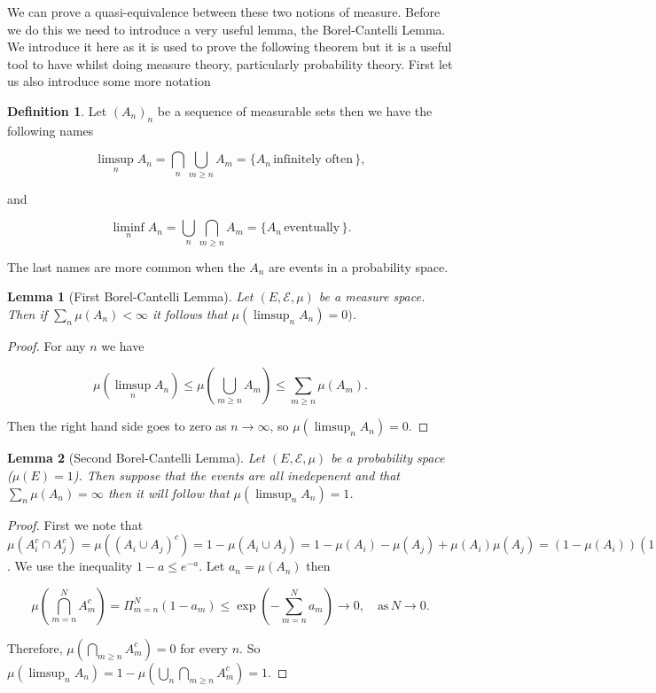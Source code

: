 \documentclass[
]{book}
\newtheorem{lemma}{Lemma}[chapter]
\theoremstyle{definition}
\newtheorem{definition}{Definition}[chapter]
\theoremstyle{definition}
\theoremstyle{definition}
\theoremstyle{definition}
\theoremstyle{remark}
\begin{document}
We can prove a quasi-equivalence between these two notions of measure. Before we do this we need to introduce a very useful lemma, the Borel-Cantelli Lemma. We introduce it here as it is used to prove the following theorem but it is a useful tool to have whilst doing measure theory, particularly probability theory. First let us also introduce some more notation

\begin{definition}
Let \((A_n)_n\) be a sequence of measurable sets then we have the following names

\[ \limsup_n A_n = \bigcap_n \bigcup_{m \geq n} A_m = \{ A_n \, \mbox{infinitely often}\,\}, \]

and

\[ \liminf_n A_n = \bigcup_n \bigcap_{m \geq n} A_m = \{ A_n \, \mbox{eventually}\,\}. \]

The last names are more common when the \(A_n\) are events in a probability space.
\end{definition}

\begin{lemma}[First Borel-Cantelli Lemma]
Let \((E, \mathcal{E}, \mu)\) be a measure space. Then if \(\sum_n \mu(A_n) < \infty\) it follows that \(\mu(\limsup_n A_n) = 0)\).
\end{lemma}

\begin{proof}
For any \(n\) we have

\[ \mu(\limsup_n A_n) \leq \mu \left( \bigcup_{m \geq n} A_m\right) \leq \sum_{m \geq n} \mu(A_m). \]

Then the right hand side goes to zero as \(n \rightarrow \infty\), so \(\mu(\limsup_n A_n) = 0\).
\end{proof}

\begin{lemma}[Second Borel-Cantelli Lemma]
Let \((E, \mathcal{E}, \mu)\) be a probability space (\(\mu(E) =1\)). Then suppose that the events are all inedepenent and that \(\sum_n \mu(A_n) = \infty\) then it will follow that \(\mu(\limsup_n A_n) =1\).
\end{lemma}

\begin{proof}
First we note that \(\mu(A_i^c \cap A_j^c) = \mu ((A_i \cup A_j)^c) = 1 - \mu(A_i \cup A_j) = 1 - \mu(A_i) - \mu(A_j)+ \mu(A_i)\mu(A_j) = (1-\mu(A_i))(1-\mu(A_j))\).
We use the inequality \(1-a \leq e^{-a}\). Let \(a_n = \mu(A_n)\) then

\[ \mu \left( \bigcap_{m=n}^N A_m^c \right) = \Pi_{m=n}^N (1-a_m) \leq \exp \left( - \sum_{m=n}^N a_m \right) \rightarrow 0, \quad \mbox{as}\, N \rightarrow 0. \]

Therefore, \(\mu \left( \bigcap_{m \geq n} A_m^c \right) = 0\) for every \(n\). So \(\mu(\limsup_n A_n ) = 1- \mu(\bigcup_n \bigcap_{m \geq n} A_m^c) = 1\).
\end{proof}
\end{document}
